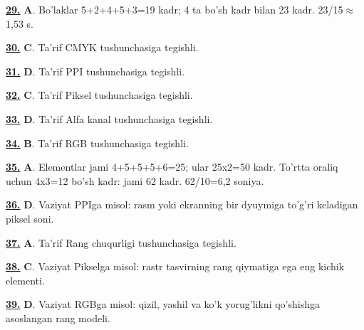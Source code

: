 \documentclass[10pt,a4paper,oneside]{article}
\begin{document}
\par\vspace{3mm}
\noindent\hyperlink{q29}{\textbf{29.}} \textbf{A}.  Bo'laklar 5+2+4+5+3=19 kadr; 4 ta bo'sh kadr bilan 23 kadr. 23/15\(\approx\)1,53 s.
\par\vspace{3mm}
\noindent\hyperlink{q30}{\textbf{30.}} \textbf{C}.  Ta'rif CMYK tushunchasiga tegishli.
\par\vspace{3mm}
\noindent\hyperlink{q31}{\textbf{31.}} \textbf{D}.  Ta'rif PPI tushunchasiga tegishli.
\par\vspace{3mm}
\noindent\hyperlink{q32}{\textbf{32.}} \textbf{C}.  Ta'rif Piksel tushunchasiga tegishli.
\par\vspace{3mm}
\noindent\hyperlink{q33}{\textbf{33.}} \textbf{D}.  Ta'rif Alfa kanal tushunchasiga tegishli.
\par\vspace{3mm}
\noindent\hyperlink{q34}{\textbf{34.}} \textbf{B}.  Ta'rif RGB tushunchasiga tegishli.
\par\vspace{3mm}
\noindent\hyperlink{q35}{\textbf{35.}} \textbf{A}.  Elementlar jami 4+5+5+5+6=25; ular 25x2=50 kadr. To'rtta oraliq uchun 4x3=12 bo'sh kadr: jami 62 kadr. 62/10=6,2 soniya.
\par\vspace{3mm}
\noindent\hyperlink{q36}{\textbf{36.}} \textbf{D}.  Vaziyat PPIga misol: rasm yoki ekranning bir dyuymiga to'g'ri keladigan piksel soni.
\par\vspace{3mm}
\noindent\hyperlink{q37}{\textbf{37.}} \textbf{A}.  Ta'rif Rang chuqurligi tushunchasiga tegishli.
\par\vspace{3mm}
\noindent\hyperlink{q38}{\textbf{38.}} \textbf{C}.  Vaziyat Pikselga misol: rastr tasvirning rang qiymatiga ega eng kichik elementi.
\par\vspace{3mm}
\noindent\hyperlink{q39}{\textbf{39.}} \textbf{D}.  Vaziyat RGBga misol: qizil, yashil va ko'k yorug'likni qo'shishga asoslangan rang modeli.
\end{document}
